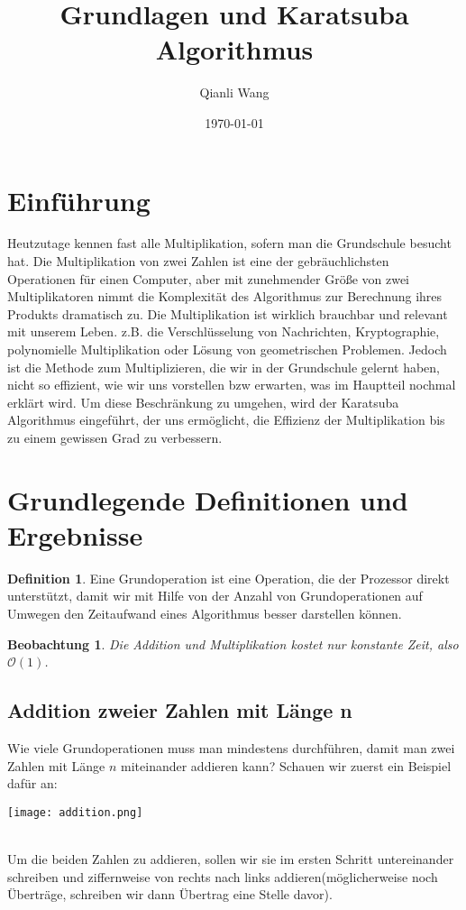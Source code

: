 \documentclass[11pt,a4paper, twoside]{article}
\author{Qianli Wang}
\title{Grundlagen und Karatsuba Algorithmus}
\date{\today}
\newtheorem{observation}[theorem]{Beobachtung}
\theoremstyle{definition}
\newtheorem{definition}[theorem]{Definition}
\begin{document}
\maketitle
\thispagestyle{fancy}
\section{Einführung}
Heutzutage kennen fast alle Multiplikation, sofern man die Grundschule besucht hat. Die Multiplikation von zwei Zahlen ist eine der gebräuchlichsten Operationen für einen Computer, aber mit zunehmender Größe von zwei Multiplikatoren nimmt die Komplexität des Algorithmus zur Berechnung ihres Produkts dramatisch zu. Die Multiplikation ist wirklich brauchbar und relevant mit unserem Leben. z.B. die Verschlüsselung von Nachrichten, Kryptographie, polynomielle Multiplikation oder Lösung von geometrischen Problemen. Jedoch ist die Methode zum Multiplizieren, die wir in der Grundschule gelernt haben, nicht so effizient, wie wir uns vorstellen bzw erwarten, was im Hauptteil nochmal erklärt wird. Um diese Beschränkung zu umgehen, wird  der Karatsuba Algorithmus eingeführt, der uns ermöglicht, die Effizienz der Multiplikation bis zu einem gewissen Grad zu verbessern.



\section{Grundlegende Definitionen und Ergebnisse}
\begin{definition}Eine Grundoperation ist eine Operation, die der Prozessor direkt unterstützt, damit wir mit Hilfe von der Anzahl von Grundoperationen auf Umwegen den Zeitaufwand eines Algorithmus besser darstellen können.

\begin{observation}
Die Addition und Multiplikation kostet nur konstante Zeit, also $\mathcal{O}(1)$.
\end{observation}

\end{definition}
\subsection{Addition zweier Zahlen mit Länge n}
Wie viele Grundoperationen muss man mindestens durchführen, damit man zwei Zahlen mit Länge \(n\) miteinander addieren kann? Schauen wir zuerst ein Beispiel dafür an: \\
\centerline{\texttt{[image: addition.png]}}\\
Um die beiden Zahlen zu addieren, sollen wir sie im ersten Schritt untereinander schreiben und ziffernweise von rechts nach links addieren(möglicherweise noch Überträge, schreiben wir dann Übertrag eine Stelle davor). 
\end{document}
